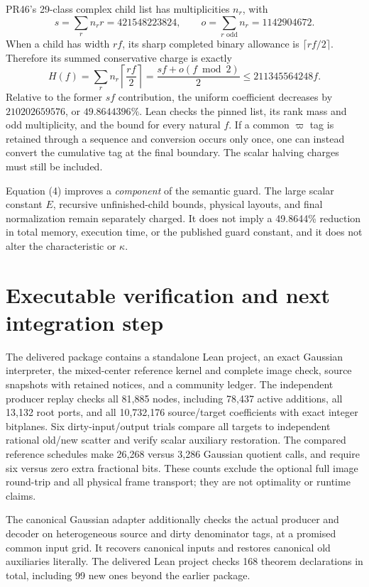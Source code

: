\documentclass[11pt,a4paper]{article}
\newcommand{\pii}{\varpi}
\begin{document}
PR46's 29-class complex child list has multiplicities $n_r$, with
\[
 s=\sum_r n_rr=421548223824,\qquad
 o=\sum_{r\text{ odd}}n_r=1142904672.
\]
When a child has width $rf$, its sharp completed binary allowance is
$\lceil rf/2\rceil$. Therefore its summed conservative charge is exactly
\[
 H(f)=\sum_rn_r\left\lceil\frac{rf}{2}\right\rceil
 =\frac{sf+o(f\bmod2)}2
 \le 211345564248f.\tag{4}
\]
Relative to the former $sf$ contribution, the uniform coefficient decreases
by $210202659576$, or $49.8644396\%$. Lean checks the pinned list, its rank
mass and odd multiplicity, and the bound for every natural $f$. If a common
$\pii$ tag is retained through a sequence and conversion occurs only once,
one can instead convert the cumulative tag at the final boundary. The
scalar halving charges must still be included.

Equation (4) improves a \emph{component} of the semantic guard. The large
scalar constant $E$, recursive unfinished-child bounds, physical layouts,
and final normalization remain separately charged. It does not imply a
49.8644\% reduction in total memory, execution time, or the published
guard constant, and it does not alter the characteristic or $\kappa$.

\section{Executable verification and next integration step}
The delivered package contains a standalone Lean project, an exact
Gaussian interpreter, the mixed-center reference kernel and complete image
check, source snapshots with retained notices, and a community ledger.
The independent producer replay checks all 81,885 nodes, including 78,437
active additions, all 13,132 root ports, and all 10,732,176 source/target
coefficients with exact integer bitplanes. Six dirty-input/output trials
compare all targets to independent rational old/new scatter and verify
scalar auxiliary restoration. The compared reference schedules make
26,268 versus 3,286 Gaussian quotient calls, and require six versus zero
extra fractional bits. These counts exclude the optional full image
round-trip and all physical frame transport; they are not optimality or
runtime claims.

The canonical Gaussian adapter additionally checks the actual producer and
decoder on heterogeneous source and dirty denominator tags, at a promised
common input grid. It recovers canonical inputs and restores canonical old
auxiliaries literally. The delivered Lean project checks 168 theorem
declarations in total, including 99 new ones beyond the earlier package.
\end{document}
